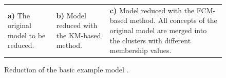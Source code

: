 \documentclass[graybox]{svmult}
\begin{document}
\begin{center}
\begin{figure}
\begin{tabular}{p{}p{}p{}}
      \textbf{a)} The original model to be reduced. &
      \textbf{b)} Model reduced with the KM-based method. &
      \textbf{c)} Model reduced with the FCM-based method. All concepts of the original model are merged into the clusters with different membership values.\\
    \end{tabular}
    \caption{Reduction of the basic example model \cite{hatwagnernovel}.}
    \label{fig:simpleExample}
  \end{figure}
\end{center}

\begin{table}
  \caption{Connection matrix and data vectors of the basic example model \cite{hatwagnernovel}.}
  \label{tab:connBasic}
  \begin{center}
    \hspace{1em}
  \end{center}
\end{table}
\end{document}
